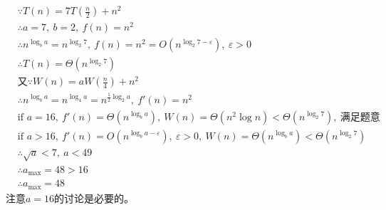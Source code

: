 \documentclass[./../main.tex]{subfiles} %
\begin{document}
\begin{align*}
    &\because T(n) = 7T\left(\frac{n}{2}\right) + n^{2} \\
    &\therefore a = 7,\ b = 2,\ f(n) = n^{2} \\
    &\therefore n^{\log_{b}a} = n^{\log_{2}7},\ 
    f(n) = n^{2} = O\left(n^{\log_{2}7 - \varepsilon}\right),\ \varepsilon > 0 \\
    &\therefore T(n) = \Theta\left(n^{\log_{2}7}\right) \\
    &\text{又}\because W(n) = aW\left(\frac{n}{4}\right) + n^{2} \\
    &\therefore n^{\log_{b}a} = n^{\log_{4}a} = n^{\frac{1}{2}\log_{2}a},\ 
    f'(n) = n^{2} \\
    &\text{if } a = 16,\ f'(n) = \Theta\left(n^{\log_{b}a}\right),\ 
    W(n) = \Theta\left(n^{2} \log n\right) < \Theta\left(n^{\log_{2}7}\right),\ \text{满足题意} \\
    &\text{if } a > 16,\ f'(n) = O\left(n^{\log_{b}a - \varepsilon}\right),\ \varepsilon > 0,\ 
    W(n) = \Theta\left(n^{\log_{b}a}\right) < \Theta\left(n^{\log_{2}7}\right) \\
    &\therefore \sqrt{a} < 7,\ a < 49 \\
    &\therefore a_{\max} = 48 > 16 \\
    &\therefore a_{\max} = 48
\end{align*}
注意$a=16$的讨论是必要的。
\end{document}
